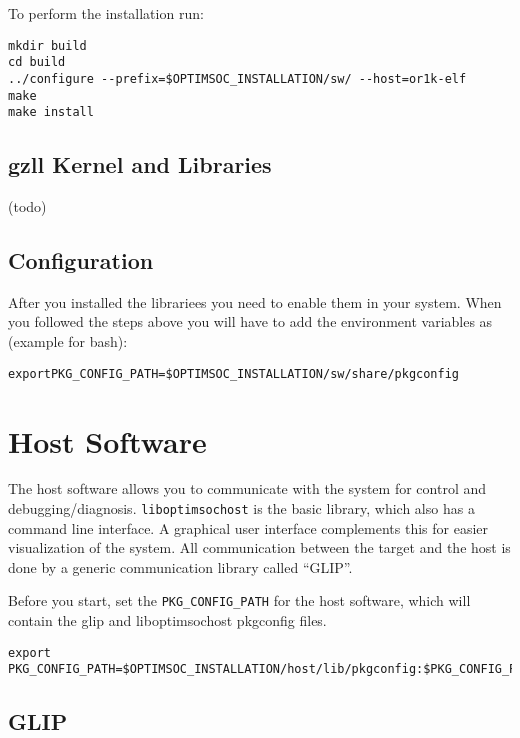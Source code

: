
To perform the installation run:

\begin{verbatim}
mkdir build
cd build
../configure --prefix=$OPTIMSOC_INSTALLATION/sw/ --host=or1k-elf
make
make install
\end{verbatim}

\subsection{gzll Kernel and Libraries}

(todo)

\subsection{Configuration}

After you installed the librariees you need to enable them in your
system. When you followed the steps above you will have to add the
environment variables as (example for bash):

\begin{alltt}
export PKG_CONFIG_PATH=\$OPTIMSOC_INSTALLATION/sw/share/pkgconfig
\end{alltt}

\section{Host Software}

The host software allows you to communicate with the system for
control and debugging/diagnosis. \verb|liboptimsochost| is the basic
library, which also has a command line interface. A graphical user
interface complements this for easier visualization of the system. All
communication between the target and the host is done by a generic communication
library called ``GLIP''.

Before you start, set the \verb|PKG_CONFIG_PATH| for the host software, which
will contain the glip and liboptimsochost pkgconfig files.

\begin{verbatim}
export PKG_CONFIG_PATH=$OPTIMSOC_INSTALLATION/host/lib/pkgconfig:$PKG_CONFIG_PATH
\end{verbatim}

\subsection{GLIP}

